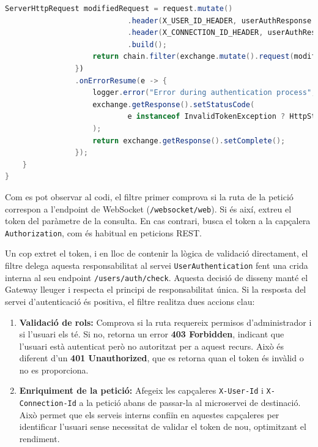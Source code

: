 \begin{lstlisting}[language=Java, caption={Implementació del filtre `JwtAuthenticationFilter`}]
                    ServerHttpRequest modifiedRequest = request.mutate()
                            .header(X_USER_ID_HEADER, userAuthResponse.getId().toString())
                            .header(X_CONNECTION_ID_HEADER, userAuthResponse.getConnectionId())
                            .build();
                    return chain.filter(exchange.mutate().request(modifiedRequest).build());
                })
                .onErrorResume(e -> {
                    logger.error("Error during authentication process", e);
                    exchange.getResponse().setStatusCode(
                            e instanceof InvalidTokenException ? HttpStatus.UNAUTHORIZED : HttpStatus.INTERNAL_SERVER_ERROR
                    );
                    return exchange.getResponse().setComplete();
                });
    }
}
\end{lstlisting}

Com es pot observar al codi, el filtre primer comprova si la ruta de la petició correspon a l'endpoint de WebSocket (\texttt{/websocket/web}). Si és així, extreu el token del paràmetre de la consulta. En cas contrari, busca el token a la capçalera \texttt{Authorization}, com és habitual en peticions REST.

Un cop extret el token, i en lloc de contenir la lògica de validació directament, el filtre delega aquesta responsabilitat al servei \texttt{UserAuthentication} fent una crida interna al seu endpoint \texttt{/users/auth/check}. Aquesta decisió de disseny manté el Gateway lleuger i respecta el principi de responsabilitat única. Si la resposta del servei d'autenticació és positiva, el filtre realitza dues accions clau:
\begin{enumerate}
    \item \textbf{Validació de rols:} Comprova si la ruta requereix permisos d'administrador i si l'usuari els té. Si no, retorna un error \textbf{403 Forbidden}, indicant que l'usuari està autenticat però no autoritzat per a aquest recurs. Això és diferent d'un \textbf{401 Unauthorized}, que es retorna quan el token és invàlid o no es proporciona.
    \item \textbf{Enriquiment de la petició:} Afegeix les capçaleres \texttt{X-User-Id} i \texttt{X-Connection-Id} a la petició abans de passar-la al microservei de destinació. Això permet que els serveis interns confiïn en aquestes capçaleres per identificar l'usuari sense necessitat de validar el token de nou, optimitzant el rendiment.
\end{enumerate}

